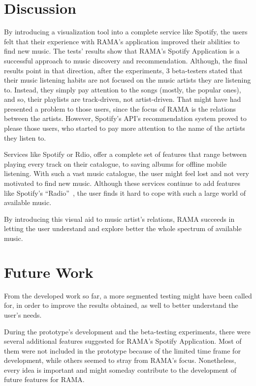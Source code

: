 
\section{Discussion} %
\label{sec:discussion}

  By introducing a visualization tool into a complete service like Spotify, the users felt that their experience with RAMA's application improved their abilities to find new music.
  The tests' results show that RAMA's Spotify Application is a successful approach to music discovery and recommendation.
  Although, the final results point in that direction, after the experiments, 3 beta-testers stated that their music listening habits are not focused on the music artists they are listening to. Instead, they simply pay attention to the songs (mostly, the popular ones), and so, their playlists are track-driven, not artist-driven.
  That might have had presented a problem to those users, since the focus of RAMA is the relations between the artists.
  However, Spotify's API's recommendation system proved to please those users, who started to pay more attention to the name of the artists they listen to.

  Services like Spotify or Rdio, offer a complete set of features that range between playing every track on their catalogue, to saving albums for offline mobile listening.
  With such a vast music catalogue, the user might feel lost and not very motivated to find new music.
  Although these services continue to add features like Spotify's ``Radio''~\cite{spradio}, the user finds it hard to cope with such a large world of available music.

  By introducing this visual aid to music artist's relations, RAMA succeeds in letting the user understand and explore better the whole spectrum of available music.


\section{Future Work} %
\label{sec:future_work}

  From the developed work so far, a more segmented testing might have been called for, in order to improve the results obtained, as well to better understand the user's needs.

  During the prototype's development and the beta-testing experiments, there were several additional features suggested for RAMA's Spotify Application.
  Most of them were not included in the prototype because of the limited time frame for development, while others seemed to stray from RAMA's focus.
  Nonetheless, every idea is important and might someday contribute to the development of future features for RAMA.

